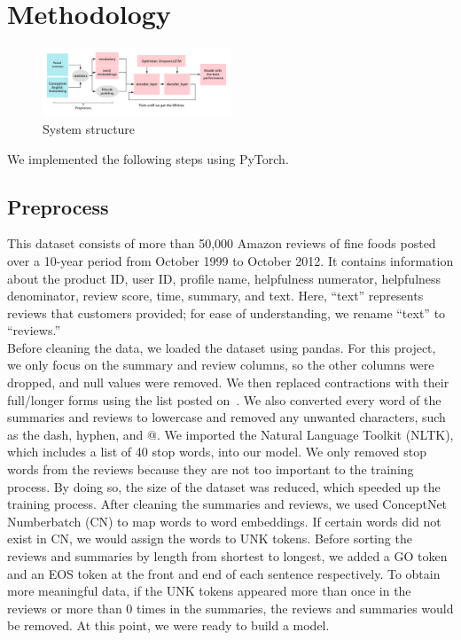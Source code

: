 \documentclass[conference]{IEEEtran}
\begin{document}
\section{Methodology}
\begin{figure}[h]
\centering
\includegraphics[width=0.5\textwidth]{imgs/System_Structure.png}
\caption{System structure}
\label{fig:System_Structure}
\end{figure}
\begin{flushleft} 
We implemented the following steps using PyTorch.
\end{flushleft}
\subsection{Preprocess}
This dataset consists of more than 50,000 Amazon reviews of fine foods posted over a 10-year period from October 1999 to October 2012. It contains information about the product ID, user ID, profile name, helpfulness numerator, helpfulness denominator, review score, time, summary, and text. Here, “text” represents reviews that customers provided; for ease of understanding, we rename “text” to “reviews.” \\
\indent Before cleaning the data, we loaded the dataset using pandas. For this project, we only focus on the summary and review columns, so the other columns were dropped, and null values were removed. We then replaced contractions with their full/longer forms using the list posted on~\cite{unknown1}. We also converted every word of the summaries and reviews to lowercase and removed any unwanted characters, such as the dash, hyphen, and @. We imported the Natural Language Toolkit (NLTK), which includes a list of 40 stop words, into our model. We only removed stop words from the reviews because they are not too important to the training process. By doing so, the size of the dataset was reduced, which speeded up the training process. After cleaning the summaries and reviews, we used ConceptNet Numberbatch (CN) to map words to word embeddings. If certain words did not exist in CN, we would assign the words to UNK tokens. Before sorting the reviews and summaries by length from shortest to longest, we added a GO token and an EOS token at the front and end of each sentence respectively. To obtain more meaningful data, if the UNK tokens appeared more than once in the reviews or more than 0 times in the summaries, the reviews and summaries would be removed. At this point, we were ready to build a model.
\end{document}
